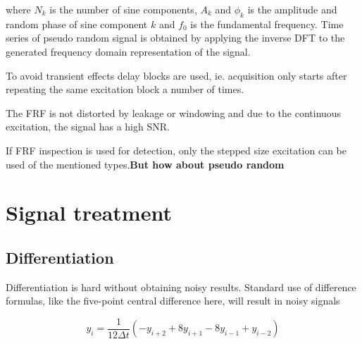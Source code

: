 \begin{itemize}
  where $N_k$ is the number of sine components, $A_k$ and $\phi_k$ is the
  amplitude and random phase of sine component $k$ and $f_0$ is the fundamental
  frequency. Time series of pseudo random signal is obtained by applying the
  inverse DFT to the generated frequency domain representation of the signal.

  To avoid transient effects delay blocks are used, ie. acquisition only starts
  after repeating the same excitation block a number of times.

  The FRF is not distorted by leakage or windowing and due to the continuous
  excitation, the signal has a high SNR.
\end{itemize}


If FRF inspection is used for detection, only the stepped size excitation can be
used of the mentioned types.\textbf{But how about pseudo random}



\section{Signal treatment}
\label{sec:signal-treatment}

\subsection{Differentiation}
\label{sec:differentiation}

Differentiation is hard without obtaining noisy results. Standard use of
difference formulas, like the five-point central difference here, will result in noisy signals

\begin{equation}
  \label{eq:central_difference}
  y_i = \frac{1}{12 \Delta t} \left( -y_{i+2} + 8y_{i+1} - 8y_{i-1} + y_{i-2} \right)
\end{equation}



